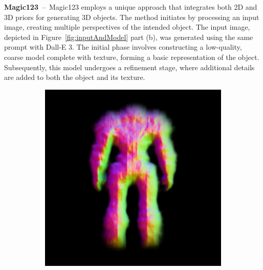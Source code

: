 \textbf{Magic123}~--~Magic123 employs a unique approach that integrates both 2D and 3D priors for generating 3D objects. The method initiates by processing an input image, creating multiple perspectives of the intended object. The input image, depicted in Figure~\ref{fig:inputAndModel} part (b), was generated using the same prompt with Dall-E 3. The initial phase involves constructing a low-quality, coarse model complete with texture, forming a basic representation of the object. Subsequently, this model undergoes a refinement stage, where additional details are added to both the object and its texture.

\begin{figure}[H]
    \centering
    \begin{subfigure}[b]{0.25\textwidth}
        \centering
        \fontsize{9pt}{7pt}\selectfont{}\vspace{.1cm}
        \includegraphics[width=\textwidth]{etc/a robot made out of plants/magic123/magic123_coarse_robot_front_0_part2.png}

\end{subfigure}
\end{figure}
